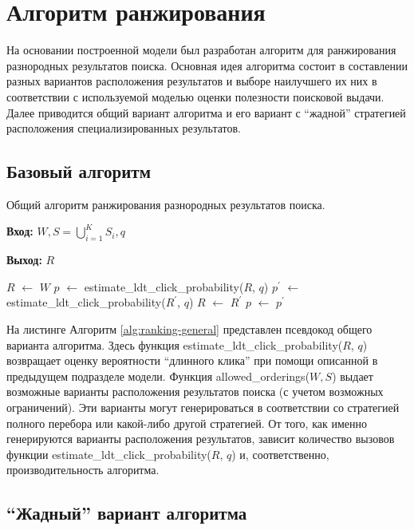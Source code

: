 \documentclass[12pt,a4paper]{report}
\makeatletter
\newenvironment{myalgorithm}[1][htb]{%
    \renewcommand{\ALG@name}{Алгоритм}%
   \begin{algorithm}[#1]%
  }{\end{algorithm}}
\newcommand*\Let[2]{\State #1 $\gets$ #2}
\makeatother
\begin{document}
\section{Алгоритм ранжирования}

На основании построенной модели был разработан алгоритм для ранжирования разнородных результатов поиска. Основная идея алгоритма состоит в составлении разных вариантов расположения результатов и выборе наилучшего их них в соответствии с используемой моделью оценки полезности поисковой выдачи. Далее приводится общий вариант алгоритма и его вариант с ``жадной'' стратегией расположения специализированных результатов.

\subsection{Базовый алгоритм}

\begin{myalgorithm}[t!]
\caption{Общий алгоритм ранжирования разнородных результатов поиска.}
\label{alg:ranking-general}
\textbf{Вход:} $W, S=\bigcup\limits_{i=1}^{K} S_i, q$ \par
\textbf{Выход:} $R$
\begin{algorithmic}[1]
    \Let{$R$}{$W$}
    \Let{$p$}{estimate\_ldt\_click\_probability($R$, $q$)}
      \Let{$p^{'}$}{estimate\_ldt\_click\_probability($R^{'}$, $q$)}
        \Let{$R$}{$R^{'}$}
        \Let{$p$}{$p^{'}$}
      \EndIf
    \EndFor
\EndFunction
\end{algorithmic}
\end{myalgorithm}

На листинге Алгоритм \ref{alg:ranking-general} представлен псевдокод общего варианта алгоритма.
Здесь функция \textrm{estimate\_ldt\_click\_probability($R$, $q$)} возвращает оценку вероятности ``длинного клика'' при помощи описанной в предыдущем подразделе модели. Функция \linebreak \textrm{allowed\_orderings($W, S$)} выдает возможные варианты расположения результатов поиска (с учетом возможных ограничений). Эти варианты могут генерироваться в соответствии со стратегией полного перебора или какой-либо другой стратегией. От того, как именно генерируются варианты расположения результатов, зависит количество вызовов функции  \textrm{estimate\_ldt\_click\_probability($R$, $q$)} и, соответственно, производительность алгоритма.

\subsection{``Жадный'' вариант алгоритма}
\end{document}
